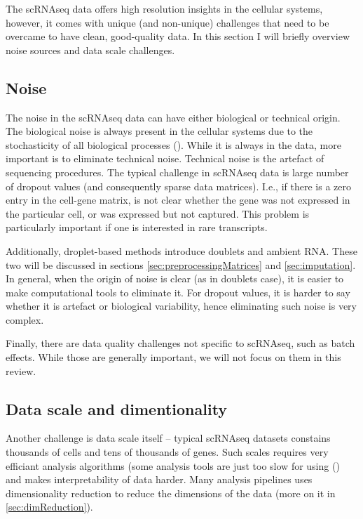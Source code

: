 The scRNAseq data offers high resolution insights in the cellular systems, however,
it comes with unique (and non-unique) challenges that need to be overcame to have clean, good-quality data.
In this section I will briefly overview noise sources and data scale challenges.

\subsection{Noise}

The noise in the scRNAseq data can have either biological or technical origin.
The biological noise is always present in the cellular systems due to the stochasticity of all biological processes (\cite{Vaz2017}).
While it is always in the data, more important is to eliminate technical noise.
Technical noise is the artefact of sequencing procedures.
The typical challenge in scRNAseq data is large number of dropout values (and consequently sparse data matrices).
I.e., if there is a zero entry in the cell-gene matrix, is not clear whether the gene was not expressed in the particular cell,
or was expressed but not captured.
This problem is particularly important if one is interested in rare transcripts.

Additionally, droplet-based methods introduce doublets and ambient RNA.
These two will be discussed in sections \ref{sec:preprocessingMatrices} and \ref{sec:imputation}.
In general, when the origin of noise is clear (as in doublets case), it is easier to make computational tools to eliminate it.
For dropout values, it is harder to say whether it is artefact or biological variability, hence eliminating such noise is very complex.

Finally, there are data quality challenges not specific to scRNAseq, such as batch effects.
While those are generally important, we will not focus on them in this review.

\subsection{Data scale and dimentionality}

Another challenge is data scale itself – typical scRNAseq datasets constains thousands of cells and tens of thousands of genes.
Such scales requires very efficiant analysis algorithms (some analysis tools are just too slow for using (\cite{McCalla2023})
and makes interpretability of data harder.
Many analysis pipelines uses dimensionality reduction to reduce the dimensions of the data (more on it in \ref{sec:dimReduction}).

